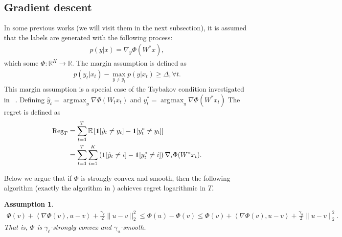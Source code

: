 \documentclass{article}
\newcommand{\Reg}{\text{\rm Reg}}
\newcommand{\one}{\boldsymbol{1}}
\newcommand{\nb}{\nabla}
\newcommand{\field}[1]{\mathbb{#1}}
\newcommand{\E}{\field{E}}
\newcommand{\inner}[1]{ \left\langle {#1} \right\rangle }
\newtheorem{assumption}{Assumption}
\DeclareMathOperator*{\argmax}{\arg\!\max}
\begin{document}
\subsection{Gradient descent}
In some previous works (we will visit them in the next subsection), it is assumed that the labels are generated with the following process: 
\begin{align}
    p(y|x) = \nabla_y\Phi(W^*x), 
\end{align}
which some $\Phi: \mathbb{R}^K \rightarrow \mathbb{R}$.
The margin assumption is defined as 
\begin{align}
    p(y_t|x_t) - \max_{y\neq y_t}p(y|x_t) \geq \Delta, \forall t.  \label{eqn:new margin}
\end{align}
This margin assumption is a special case of the Tsybakov condition investigated in ~\cite{agarwal2013selective}. 
Defining $\hat{y}_t = \argmax_y \nabla\Phi(W_tx_t)$ and $y^*_t = \argmax_y \nabla\Phi(W^*x_t) $ The regret is defined as
\begin{align}
    \Reg_T &= \sum_{t=1}^T \E\left[ \one[\hat{y}_t\neq y_t] - \one[y_t^*\neq y_t]\right] \nonumber \\
    &= \sum_{t=1}^T \sum_{i=1}^K \left(\one[\hat{y}_t\neq i] - \one[y^*_t\neq i]\right)\nabla_i\Phi(W^*x_t). \label{eqn:new regret}
\end{align}

Below we argue that if $\Phi$ is strongly convex and smooth, then the following algorithm (exactly the algorithm in \cite{agarwal2013selective}) achieves regret logarithmic in $T$. 

\begin{assumption}
\begin{align*}
     \Phi(v) + \inner{\nb\Phi(v),u-v} + \frac{\gamma_\ell}{2}\|u-v\|_2^2 \leq \Phi(u)-\Phi(v)\leq \Phi(v) + \inner{\nb\Phi(v),u-v} + \frac{\gamma_u}{2}\|u-v\|_2^2. 
\end{align*}
That is, $\Phi$ is $\gamma_\ell$-strongly convex and $\gamma_u$-smooth. 
\end{assumption}
\end{document}
